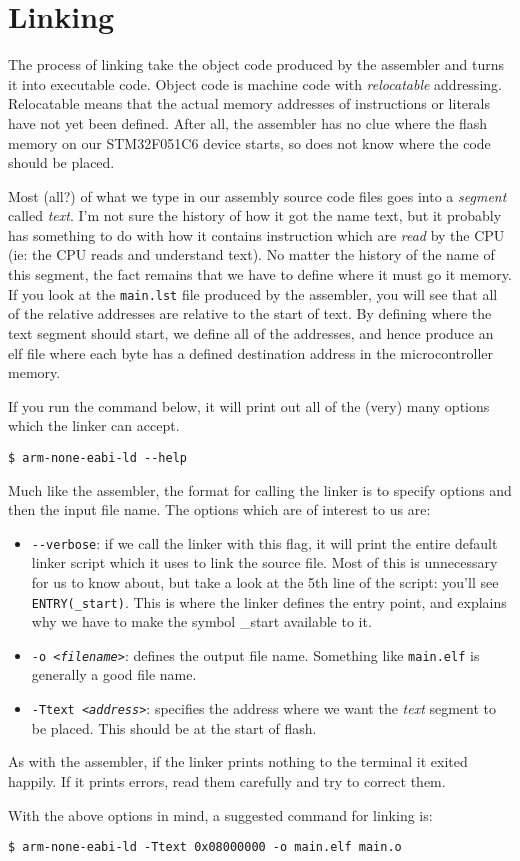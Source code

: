 \chapter{Linking}
The process of linking take the object code produced by the assembler and turns it into executable code. Object code is machine code with \textit{relocatable} addressing. Relocatable means that the actual memory addresses of instructions or literals have not yet been defined. After all, the assembler has no clue where the flash memory on our STM32F051C6 device starts, so does not know where the code should be placed.

Most (all?) of what we type in our assembly source code files goes into a \emph{segment} called \textit{text}. I'm not sure the history of how it got the name text, but it probably has something to do with how it contains instruction which are \textit{read} by the CPU (ie: the CPU reads and understand text). No matter the history of the name of this segment, the fact remains that we have to define where it must go it memory. If you look at the \texttt{main.lst} file produced by the assembler, you will see that all of the relative addresses are relative to the start of text. By defining where the text segment should start, we define all of the addresses, and hence produce an elf file where each byte has a defined destination address in the microcontroller memory.

If you run the command below, it will print out all of the (very) many options which the linker can accept. 
\begin{lstlisting}[style=BashStyle]
$ arm-none-eabi-ld --help
\end{lstlisting}

Much like the assembler, the format for calling the linker is to specify options and then the input file name. The options which are of interest to us are:
\begin{itemize}
\item \texttt{-{}-verbose}: if we call the linker with this flag, it will print the entire default linker script which it uses to link the source file. Most of this is unnecessary for us to know about, but take a look at the 5th line of the script: you'll see \texttt{ENTRY(\_start)}. This is where the linker defines the entry point, and explains why we have to make the symbol \_start available to it.
\item \texttt{-o \textit{<filename>}}: defines the output file name. Something like \texttt{main.elf} is generally a good file name.
\item \texttt{-Ttext \textit{<address>}}: specifies the address where we want the \textit{text} segment to be placed. This should be at the start of flash.
\end{itemize}

As with the assembler, if the linker prints nothing to the terminal it exited happily. If it prints errors, read them carefully and try to correct them.

With the above options in mind, a suggested command for linking is:
\begin{lstlisting}[style=BashStyle]
$ arm-none-eabi-ld -Ttext 0x08000000 -o main.elf main.o
\end{lstlisting}
